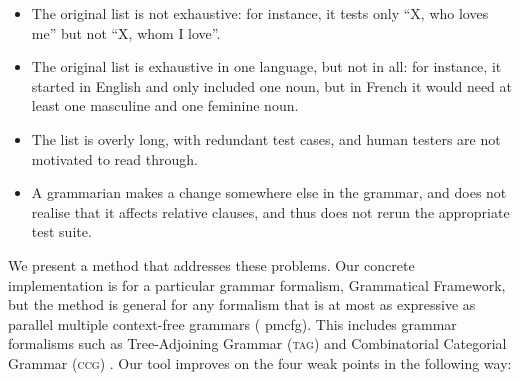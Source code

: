 \documentclass[11pt]{article}
\def\ccg{\textsc{ccg}}
\def\tag{\textsc{tag}}
\begin{document}

\begin{itemize}
\item The original list is not exhaustive: for instance, it tests only
``X, who loves me'' but not ``X, whom I love''. 
\item The original list is exhaustive in one language, but not in all:
for instance, it started in English and only included one noun, but in
French it would need at least one masculine and one feminine noun. 
\item The list is overly long, with redundant test cases, and human
testers are not motivated to read through. 
\item A grammarian makes a change somewhere else in the grammar, and
does not realise that it affects relative clauses, and thus does not
rerun the appropriate test suite. 
\end{itemize}

We present a method that addresses these problems. Our concrete
implementation is for a particular grammar formalism, Grammatical
Framework, but the method is general for any formalism that is at most
as expressive as parallel multiple context-free grammars ({\sc
  pmcfg}). This includes grammar formalisms such as Tree-Adjoining
Grammar (\tag) \cite{joshi1975tag} and Combinatorial Categorial
Grammar (\ccg) \cite{steedman1988ccg}.
Our tool improves on the four weak points in the following way:
\end{document}
